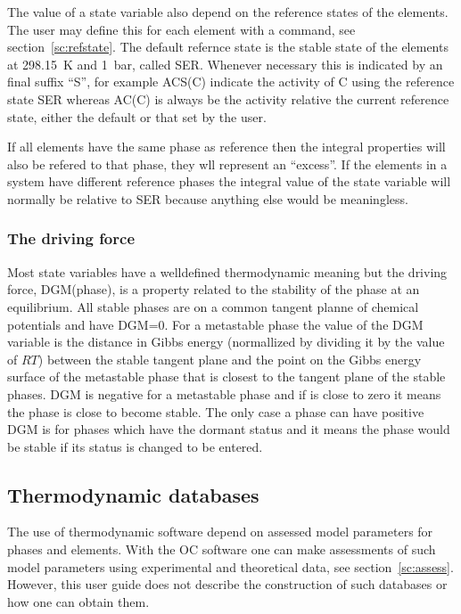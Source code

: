 \documentclass[11pt]{article}
\begin{document}
The value of a state variable also depend on the reference states of
the elements.  The user may define this for each element with a
command, see section~\ref{sc:refstate}.  The default refernce state is
the stable state of the elements at 298.15~K and 1~bar, called SER.
Whenever necessary this is indicated by an final suffix ``S'', for
example ACS(C) indicate the activity of C using the reference state
SER whereas AC(C) is always be the activity relative the current
reference state, either the default or that set by the user.

If all elements have the same phase as reference then the integral
properties will also be refered to that phase, they wll represent an
``excess''.  If the elements in a system have different reference
phases the integral value of the state variable will normally be
relative to SER because anything else would be meaningless.

\hypertarget{Info dgm}{}
\subsubsection{The driving force}\label{sc:dgm}

Most state variables have a welldefined thermodynamic meaning but the
driving force, DGM(phase), is a property related to the stability of
the phase at an equilibrium.  All stable phases are on a common
tangent planne of chemical potentials and have DGM=0.  For a
metastable phase the value of the DGM variable is the distance in
Gibbs energy (normallized by dividing it by the value of $RT$) between
the stable tangent plane and the point on the Gibbs energy surface of
the metastable phase that is closest to the tangent plane of the
stable phases.  DGM is negative for a metastable phase and if is close
to zero it means the phase is close to become stable.  The only case a
phase can have positive DGM is for phases which have the dormant
status and it means the phase would be stable if its status is changed
to be entered.

\hypertarget{Info databases}{}
\subsection{Thermodynamic databases}\label{sc:databases}

The use of thermodynamic software depend on assessed model parameters
for phases and elements.  With the OC software one can make
assessments of such model parameters using experimental and
theoretical data, see section~\ref{sc:assess}.  However, this user
guide does not describe the construction of such databases or how one
can obtain them.
\end{document}

